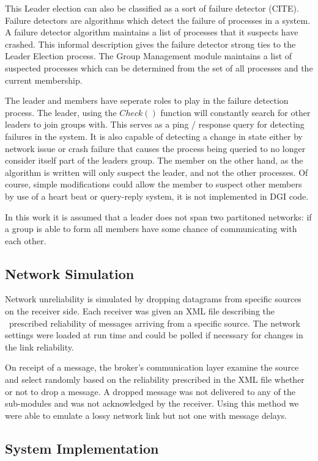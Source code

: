 This Leader election can also be classified as a sort of failure detector 
(CITE).
Failure detectors are algorithms which detect the failure of processes in a 
system.
A failure detector algorithm maintains a list of processes that it suspects have
crashed. This informal description gives the failure detector strong ties to the
Leader Election process. The Group Management module maintains a list of 
suspected
processes which can be determined from the set of all processes and the current
membership. 

The leader and members have seperate roles to play in the failure detection
process. The leader, using the $Check()$ function will constantly search for 
other
leaders to join groups with. This serves as a ping / response query for 
detecting
failures in the system. It is also capable of detecting a change in state either
by network issue or crash failure that causes the process being queried to no 
longer
consider itself part of the leaders group. The member on the other hand, as the
algorithm is written will only suspect the leader, and not the other processes.
Of course, simple modifications could allow the member to suspect other members
by use of a heart beat or query-reply system, it is not implemented in DGI code.

In this work it is assumed that a leader does not span two partitoned networks:
if a group is able to form all members have some chance of communicating with
each other.


\subsection{Network Simulation}

Network unreliability is simulated by dropping datagrams from specific sources 
on the receiver side. Each receiver was given an XML file describing the 
 prescribed reliability of messages arriving from a specific source. The 
network settings were loaded at run time and could be polled if necessary for 
changes in the link reliability.

On receipt of a message, the broker's communication layer examine the source 
and select randomly based on the reliability prescribed in the XML file whether 
or not to drop a message. A dropped message was not delivered to any of the 
sub-modules and was not acknowledged by the receiver. Using this method we were 
able to emulate a lossy network link but not one with message delays.

\subsection{System Implementation}

